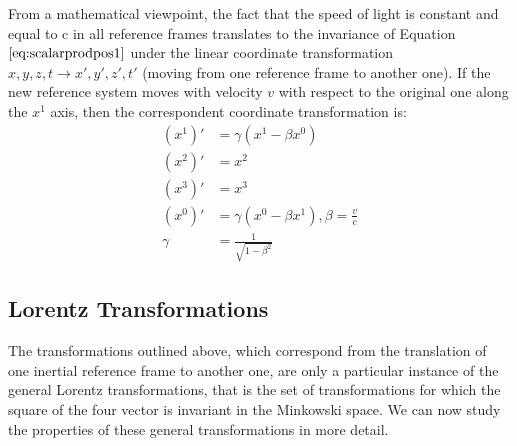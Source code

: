  \vspace{2mm}\noindent From a mathematical viewpoint, the fact that the speed of light is constant and equal to c in all reference frames translates to the invariance of Equation $\ref{eq:scalarprodpos1}$ under the linear coordinate transformation $x,y,z,t \to x',y',z',t'$ (moving from one reference frame to another one). If the new reference system moves with velocity $v$ with respect to the original one along the $x^1$ axis, then the correspondent coordinate transformation is:
\begin{align}
    (x^1)' &= \gamma(x^1-\beta x^0)\\
    (x^2)' &= x^2\\
    (x^3)' &= x^3\\
    (x^0)' &= \gamma(x^0-\beta x^1), \beta = \frac{v}{c}\\
    \gamma &= \frac{1}{\sqrt{1-\beta^2}}
\end{align}
\subsection{Lorentz Transformations}
The transformations outlined above, which correspond from the translation of one inertial reference frame to another one, are only a particular instance of the general Lorentz transformations, that is the set of transformations for which the square of the four vector is invariant in the Minkowski space. We can now study the properties of these general transformations in more detail.

